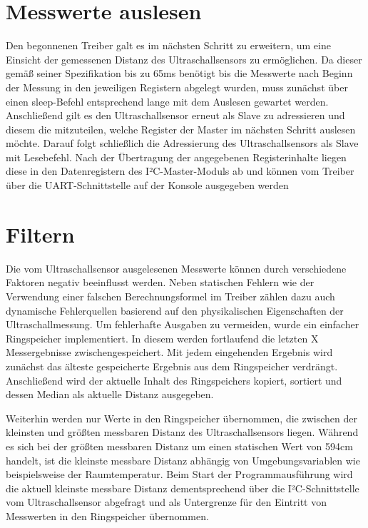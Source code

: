 \documentclass[parskip,
							 oneside,
							 11pt,
							 noheadingspace,
							 accentcolor=tud1d,
							 bigchapter,
							 colorback]{tudreport}
\begin{document}
\section{Messwerte auslesen}

Den begonnenen Treiber galt es im nächsten Schritt zu erweitern, um eine Einsicht der gemessenen Distanz des Ultraschallsensors zu ermöglichen. Da dieser gemäß seiner Spezifikation bis zu 65ms benötigt bis die Messwerte nach Beginn der Messung in den jeweiligen Registern abgelegt wurden, muss zunächst über einen sleep-Befehl entsprechend lange mit dem Auslesen gewartet werden. Anschließend gilt es den Ultraschallsensor erneut als Slave zu adressieren und diesem die mitzuteilen, welche Register der Master im nächsten Schritt auslesen möchte. Darauf folgt schließlich die Adressierung des Ultraschallsensors als Slave mit Lesebefehl. Nach der Übertragung der angegebenen Registerinhalte liegen diese in den Datenregistern des I²C-Master-Moduls ab und können vom Treiber über die UART-Schnittstelle auf der Konsole ausgegeben werden

\section{Filtern}

Die vom Ultraschallsensor ausgelesenen Messwerte können durch verschiedene Faktoren negativ beeinflusst werden. Neben statischen Fehlern wie der Verwendung einer falschen Berechnungsformel im Treiber zählen dazu auch dynamische Fehlerquellen basierend auf den physikalischen Eigenschaften der Ultraschallmessung. Um fehlerhafte Ausgaben zu vermeiden, wurde ein einfacher Ringspeicher implementiert. In diesem werden fortlaufend die letzten X Messergebnisse zwischengespeichert. Mit jedem eingehenden Ergebnis wird zunächst das älteste gespeicherte Ergebnis aus dem Ringspeicher verdrängt. Anschließend wird der aktuelle Inhalt des Ringspeichers kopiert, sortiert und dessen Median als aktuelle Distanz ausgegeben.

Weiterhin werden nur Werte in den Ringspeicher übernommen, die zwischen der kleinsten und größten messbaren Distanz des Ultraschallsensors liegen. Während es sich bei der größten messbaren Distanz um einen statischen Wert von 594cm handelt, ist die kleinste messbare Distanz abhängig von Umgebungsvariablen wie beispielsweise der Raumtemperatur. Beim Start der Programmausführung wird die aktuell kleinste messbare Distanz dementsprechend über die I²C-Schnittstelle vom Ultraschallsensor abgefragt und als Untergrenze für den Eintritt von Messwerten in den Ringspeicher übernommen.
\end{document}
